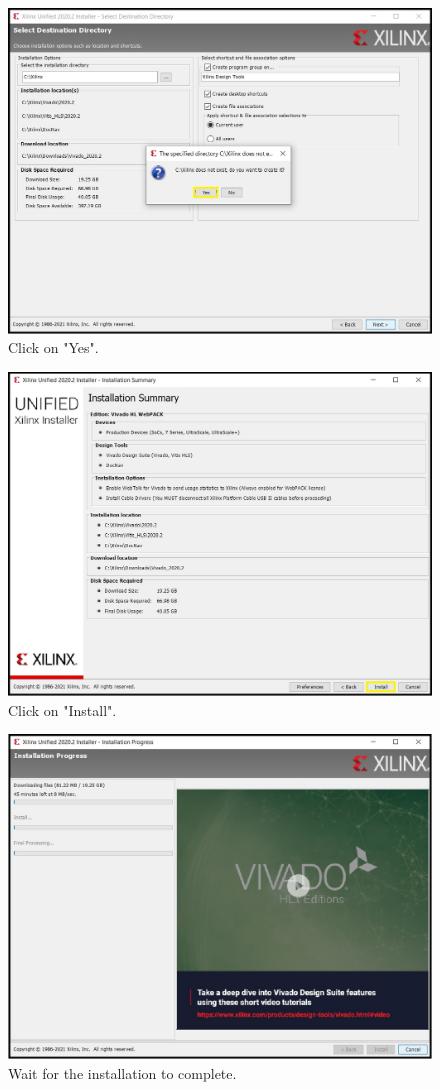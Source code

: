\begin{figure}[H]
\centering
  \includegraphics[width=0.8\linewidth]{images/VivadoInstimg015.jpg}
  \captionsetup{width=0.8\linewidth}
  \caption{Click on "Yes".}
  \label{fig:VivadoInstimg015}
\end{figure}

\begin{figure}[H]
\centering
  \includegraphics[width=0.8\linewidth]{images/VivadoInstimg016.jpg}
  \captionsetup{width=0.8\linewidth}
  \caption{Click on "Install".}
  \label{fig:VivadoInstimg016}
\end{figure}

\begin{figure}[H]
\centering
  \includegraphics[width=0.8\linewidth]{images/VivadoInstimg017.jpg}
  \captionsetup{width=0.8\linewidth}
  \caption{Wait for the installation to complete.}
  \label{fig:VivadoInstimg07}
\end{figure}

